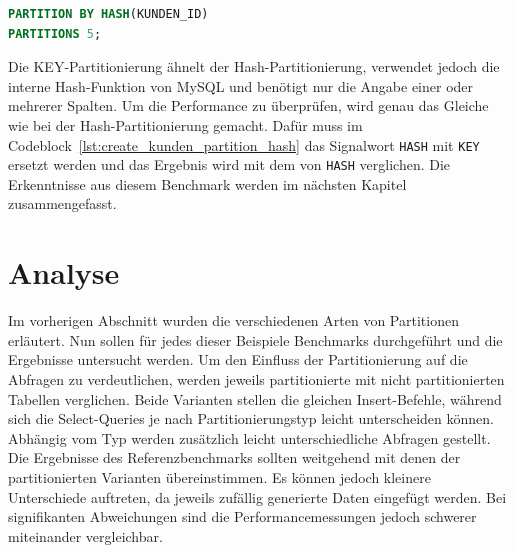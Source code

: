\vspace{-7pt}
\begin{lstlisting}[language=SQL,caption=Hash-Partitonierung,label={lst:create_kunden_partition_hash}]
PARTITION BY HASH(KUNDEN_ID)
PARTITIONS 5;
\end{lstlisting}
\vspace{-5pt}

Die KEY-Partitionierung ähnelt der Hash-Partitionierung, verwendet jedoch die interne Hash-Funktion von MySQL und benötigt nur die Angabe einer oder mehrerer Spalten.
Um die Performance zu überprüfen, wird genau das Gleiche wie bei der Hash-Partitionierung gemacht.
Dafür muss im Codeblock~\ref{lst:create_kunden_partition_hash} das Signalwort \texttt{HASH} mit \texttt{KEY} ersetzt werden und das Ergebnis wird mit dem von \texttt{HASH} verglichen.
Die Erkenntnisse aus diesem Benchmark werden im nächsten Kapitel zusammengefasst.

\section{Analyse}\label{sec:partition-analyse}

Im vorherigen Abschnitt wurden die verschiedenen Arten von Partitionen erläutert.
Nun sollen für jedes dieser Beispiele Benchmarks durchgeführt und die Ergebnisse untersucht werden.
Um den Einfluss der Partitionierung auf die Abfragen zu verdeutlichen, werden jeweils partitionierte mit nicht partitionierten Tabellen verglichen.
Beide Varianten stellen die gleichen Insert-Befehle, während sich die Select-Queries je nach Partitionierungstyp leicht unterscheiden können.
Abhängig vom Typ werden zusätzlich leicht unterschiedliche Abfragen gestellt.
Die Ergebnisse des Referenzbenchmarks sollten weitgehend mit denen der partitionierten Varianten übereinstimmen.
Es können jedoch kleinere Unterschiede auftreten, da jeweils zufällig generierte Daten eingefügt werden.
Bei signifikanten Abweichungen sind die Performancemessungen jedoch schwerer miteinander vergleichbar.

